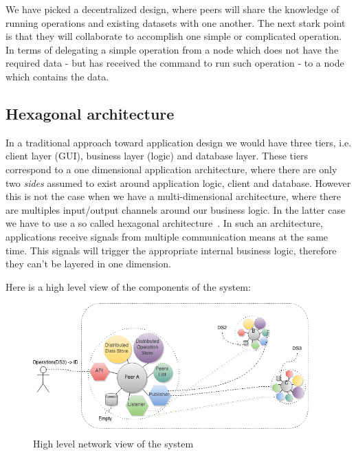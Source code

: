 We have picked a decentralized design, where peers will share the knowledge of running operations and existing datasets
with one another. The next stark point is that they will collaborate to accomplish one simple or complicated operation.
In terms of delegating a simple operation from a node which does not have the required data - but has received the command
to run such operation - to a node which contains the data.

\subsection{Hexagonal architecture}
In a traditional approach toward application design we would have three tiers, i.e. client layer (GUI),
business layer (logic) and database layer. These tiers correspond to a one dimensional application architecture,
where there are only two \textit{sides} assumed to exist around application logic, client and database. However
this is not the case when we have a multi-dimensional architecture, where there are multiples input/output channels
around our business logic. In the latter case we have to use a so called hexagonal architecture~\cite{alistair}.
In such an architecture, applications receive signals from multiple communication means at the same time. This 
signals will trigger the appropriate internal business logic, therefore they can't be layered in one dimension.

Here is a high level view of the components of the system:

\begin{figure}[h]
  \centering
  \includegraphics[width=6in]{poster/figures/sys2.png}
  \caption[High level view of a network of collaborative peers]
   {High level network view of the system}
\end{figure}

